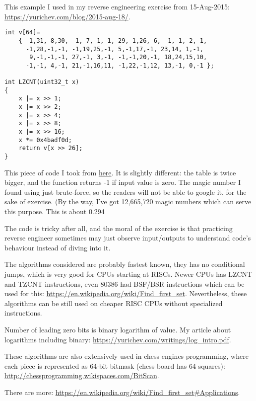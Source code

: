 This example I used in my reverse engineering exercise from 15-Aug-2015: \url{https://yurichev.com/blog/2015-aug-18/}.

\begin{lstlisting}
int v[64]=
	{ -1,31, 8,30, -1, 7,-1,-1, 29,-1,26, 6, -1,-1, 2,-1,
	  -1,28,-1,-1, -1,19,25,-1, 5,-1,17,-1, 23,14, 1,-1,
	   9,-1,-1,-1, 27,-1, 3,-1, -1,-1,20,-1, 18,24,15,10,
	  -1,-1, 4,-1, 21,-1,16,11, -1,22,-1,12, 13,-1, 0,-1 };

int LZCNT(uint32_t x)
{
    x |= x >> 1;
    x |= x >> 2;
    x |= x >> 4;
    x |= x >> 8;
    x |= x >> 16;
    x *= 0x4badf0d;
    return v[x >> 26];
}
\end{lstlisting}

This piece of code I took from \href{http://stackoverflow.com/questions/7365562/de-bruijn-like-sequence-for-2n-1-how-is-it-constructed/7369288#7369288}{here}.
It is slightly different: the table is twice bigger, and the function returns -1 if input value is zero.
The magic number I found using just brute-force, so the readers will not be able to google it, for the sake of exercise.
(By the way, I've got 12,665,720 magic numbers which can serve this purpose.
This is about 0.294%

The code is tricky after all, and the moral of the exercise is that practicing reverse engineer sometimes may just observe input/outputs to understand
code's behaviour instead of diving into it.


The algorithms considered are probably fastest known, they has no conditional jumps, which is very good for CPUs starting at RISCs.
Newer CPUs has LZCNT and TZCNT instructions, even 80386 had BSF/BSR instructions which can be used for this: 
\url{https://en.wikipedia.org/wiki/Find_first_set}.
Nevertheless, these algorithms can be still used on cheaper RISC CPUs without specialized instructions.


Number of leading zero bits is binary logarithm of value. My article about logarithms including binary:
\url{https://yurichev.com/writings/log_intro.pdf}.

These algorithms are also extensively used in chess engines programming, where each piece is represented as 64-bit bitmask (chess board has 64 squares):
\url{http://chessprogramming.wikispaces.com/BitScan}.

There are more: \url{https://en.wikipedia.org/wiki/Find_first_set\#Applications}.

